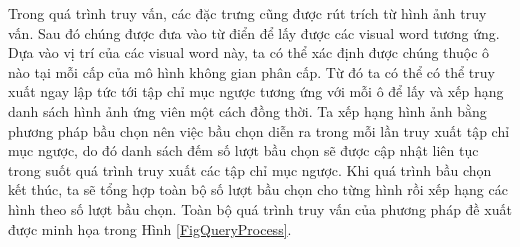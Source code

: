 Trong quá trình truy vấn, các đặc trưng cũng được rút trích từ hình ảnh truy vấn. Sau đó chúng được đưa vào từ điển để lấy được các visual word tương ứng. Dựa vào vị trí của các visual word này, ta có thể xác định được chúng thuộc ô nào tại mỗi cấp của mô hình không gian phân cấp. Từ đó ta có thể có thể truy xuất ngay lập tức tới tập chỉ mục ngược tương ứng với mỗi ô để lấy và xếp hạng danh sách hình ảnh ứng viên một cách đồng thời. Ta xếp hạng hình ảnh bằng phương pháp bầu chọn nên việc bầu chọn diễn ra trong mỗi lần truy xuất tập chỉ mục ngược, do đó danh sách đếm số lượt bầu chọn sẽ được cập nhật liên tục trong suốt quá trình truy xuất các tập chỉ mục ngược. Khi quá trình bầu chọn kết thúc, ta sẽ tổng hợp toàn bộ số lượt bầu chọn cho từng hình rồi xếp hạng các hình theo số lượt bầu chọn. Toàn bộ quá trình truy vấn của phương pháp đề xuất được minh họa trong Hình \ref{FigQueryProcess}.

